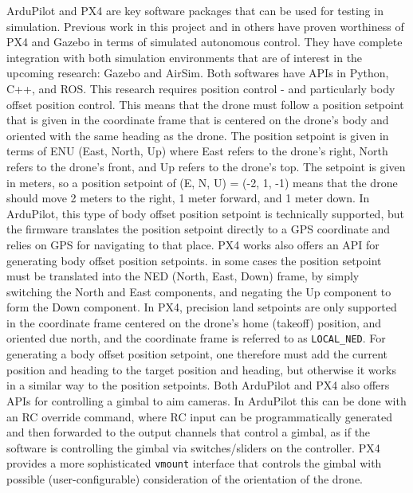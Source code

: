 ArduPilot and PX4 are key software packages that can be used for testing in simulation.
Previous work in this project and in others have proven worthiness of PX4 and Gazebo in terms of simulated autonomous control.
They have complete integration with both simulation environments that are of interest in the upcoming research:
Gazebo and AirSim.
Both softwares have APIs in Python, C++, and ROS.
This research requires position control - and particularly body offset position control.
This means that the drone must follow a position setpoint that is given in the coordinate frame
that is centered on the drone's body and oriented with the same heading as the drone.
The position setpoint is given in terms of ENU (East, North, Up)
where East refers to the drone's right,
North refers to the drone's front,
and Up refers to the drone's top.
The setpoint is given in meters, so a position setpoint of (E, N, U) = (-2, 1, -1)
means that the drone should move 2 meters to the right,
1 meter forward, and 1 meter down.
In ArduPilot, this type of body offset position setpoint is technically supported,
but the firmware translates the position setpoint
directly to a GPS coordinate and relies on GPS for navigating to that place.
PX4 works also offers an API for generating body offset position setpoints.
in some cases the position setpoint must be translated into the NED (North, East, Down) frame,
by simply switching the North and East components, and negating the Up component to form the Down component.
In PX4, precision land setpoints are only supported in the coordinate frame centered on the drone's home (takeoff) position,
and oriented due north, and the coordinate frame is referred to as \texttt{LOCAL\_NED}.
For generating a body offset position setpoint, one therefore must add the current position and heading
to the target position and heading, but otherwise it works in a similar way to the position setpoints.
Both ArduPilot and PX4 also offers APIs for controlling a gimbal to aim cameras.
In ArduPilot this can be done with an RC override command, where RC input can be programmatically generated and then
forwarded to the output channels that control a gimbal,
as if the software is controlling the gimbal via switches/sliders on the controller.
PX4 provides a more sophisticated \texttt{vmount} interface that controls the gimbal with possible (user-configurable) consideration
of the orientation of the drone.

